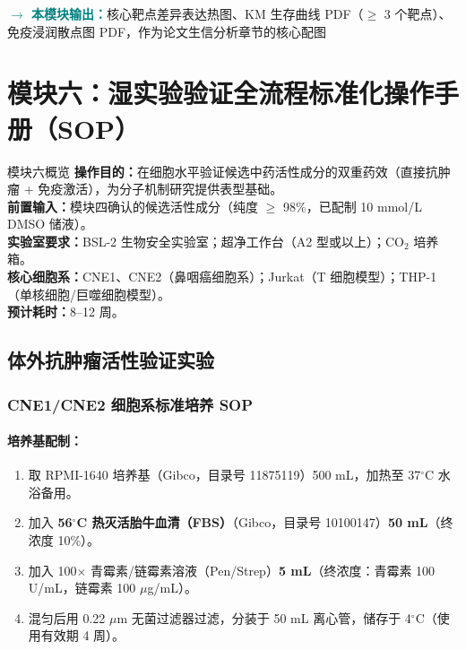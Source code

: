 \documentclass[12pt,a4paper,twoside]{article}
\newcommand{\moduleoutput}[1]{\par\vspace{6pt}\noindent\textcolor{teal}{\textbf{$\rightarrow$ 本模块输出：}}#1\vspace{6pt}}
\begin{document}
\moduleoutput{核心靶点差异表达热图、KM 生存曲线 PDF（$\geq$ 3 个靶点）、免疫浸润散点图 PDF，作为论文生信分析章节的核心配图}

\section{模块六：湿实验验证全流程标准化操作手册（SOP）}
\label{sec:module6}

\begin{infobox}{模块六概览}
\textbf{操作目的：}在细胞水平验证候选中药活性成分的双重药效（直接抗肿瘤 + 免疫激活），为分子机制研究提供表型基础。\\
\textbf{前置输入：}模块四确认的候选活性成分（纯度 $\geq$ 98\%，已配制 10 mmol/L DMSO 储液）。\\
\textbf{实验室要求：}BSL-2 生物安全实验室；超净工作台（A2 型或以上）；CO$_2$ 培养箱。\\
\textbf{核心细胞系：}CNE1、CNE2（鼻咽癌细胞系）；Jurkat（T 细胞模型）；THP-1（单核细胞/巨噬细胞模型）。\\
\textbf{预计耗时：}8--12 周。
\end{infobox}

\subsection{体外抗肿瘤活性验证实验}
\label{sec:module6_antitumor}

\subsubsection{CNE1/CNE2 细胞系标准培养 SOP}

\paragraph{培养基配制：}

\begin{enumerate}
  \item 取 RPMI-1640 培养基（Gibco，目录号 11875119）500 mL，加热至 37$^{\circ}$C 水浴备用。
  \item 加入 \textbf{56$^{\circ}$C 热灭活胎牛血清（FBS）}（Gibco，目录号 10100147）\textbf{50 mL}（终浓度 10\%）。
  \item 加入 100$\times$ 青霉素/链霉素溶液（Pen/Strep）\textbf{5 mL}（终浓度：青霉素 100 U/mL，链霉素 100 $\mu$g/mL）。
  \item 混匀后用 0.22 $\mu$m 无菌过滤器过滤，分装于 50 mL 离心管，储存于 4$^{\circ}$C（使用有效期 4 周）。
\end{enumerate}
\end{document}
